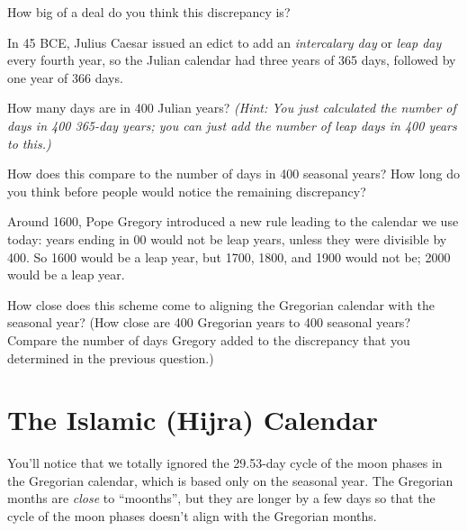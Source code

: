 \documentclass[11pt]{article}
\begin{document}
\vspace{1in}

How big of a deal do you think this discrepancy is? 

\vspace{2in}

	\underline{\hspace{6in}}
	
	\newpage

In 45 BCE, Julius Caesar issued an edict to add an {\it intercalary day} or {\it leap day} every fourth year, so the Julian calendar had three years of 365 days, followed by one year of 366 days.

How many days are in 400 Julian years? {\it (Hint: You just calculated the number of days in 400 365-day years; you can just add the number of leap days in 400 years to this.)}

\vspace{1in}

\underline{\hspace{6in}}

How does this compare to the number of days in 400 seasonal years? How long do you think before people would notice the remaining discrepancy?

\vspace{1in}
\underline{\hspace{6in}}

Around 1600, Pope Gregory introduced a new rule leading to the calendar we use today: years ending in 00 would not be leap years, unless they were divisible by 400. So 1600 would be a leap year, but 1700, 1800, and 1900 would not be; 2000 would be a leap year.

How close does this scheme come to aligning the Gregorian calendar with the seasonal year? (How close are 400 Gregorian years to 400 seasonal years? Compare the number of days Gregory added to the discrepancy that you determined in the previous question.)


\vspace{1in}
\underline{\hspace{6in}}
\newpage
\section{The Islamic (Hijra) Calendar}

You'll notice that we totally ignored the 29.53-day cycle of the moon phases in the Gregorian calendar, which is based only on the seasonal year. The Gregorian months are {\it close} to ``moonths'', but they are longer by a few days so that the cycle of the moon phases doesn't align with the Gregorian months.
\end{document}
